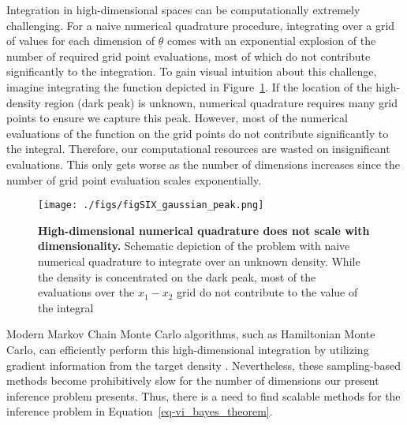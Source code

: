 \documentclass[
  letterpaper,
  DIV=11,
  numbers=noendperiod]{scrartcl}
\begin{document}
\begin{refsegment}
Integration in high-dimensional spaces can be computationally extremely
challenging. For a naive numerical quadrature procedure, integrating
over a grid of values for each dimension of \(\underline{\theta}\) comes
with an exponential explosion of the number of required grid point
evaluations, most of which do not contribute significantly to the
integration. To gain visual intuition about this challenge, imagine
integrating the function depicted in Figure~\ref{fig-SI01}. If the
location of the high-density region (dark peak) is unknown, numerical
quadrature requires many grid points to ensure we capture this peak.
However, most of the numerical evaluations of the function on the grid
points do not contribute significantly to the integral. Therefore, our
computational resources are wasted on insignificant evaluations. This
only gets worse as the number of dimensions increases since the number
of grid point evaluation scales exponentially.

\begin{figure}

{\centering \texttt{[image: ./figs/figSIX\_gaussian\_peak.png]}

}

\caption{\label{fig-SI01}\textbf{High-dimensional numerical quadrature
does not scale with dimensionality.} Schematic depiction of the problem
with naive numerical quadrature to integrate over an unknown density.
While the density is concentrated on the dark peak, most of the
evaluations over the \(x_1-x_2\) grid do not contribute to the value of
the integral}

\end{figure}

Modern Markov Chain Monte Carlo algorithms, such as Hamiltonian Monte
Carlo, can efficiently perform this high-dimensional integration by
utilizing gradient information from the target density
\textcite{betancourt2017}. Nevertheless, these sampling-based methods
become prohibitively slow for the number of dimensions our present
inference problem presents. Thus, there is a need to find scalable
methods for the inference problem in Equation~\ref{eq-vi_bayes_theorem}.


\end{refsegment}
\end{document}
